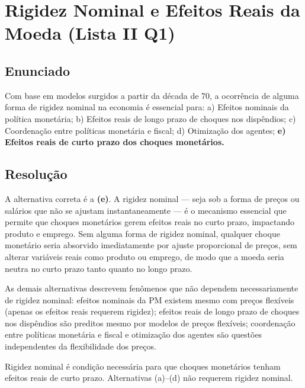 \documentclass[12pt, a4paper]{article}
\begin{document}
\section{Rigidez Nominal e Efeitos Reais da Moeda (Lista II Q1)}

\subsection*{Enunciado}
Com base em modelos surgidos a partir da década de 70, a ocorrência de alguma forma de rigidez nominal na economia é essencial para: a) Efeitos nominais da política monetária; b) Efeitos reais de longo prazo de choques nos dispêndios; c) Coordenação entre políticas monetária e fiscal; d) Otimização dos agentes; \textbf{e) Efeitos reais de curto prazo dos choques monetários.}

\subsection*{Resolução}

A alternativa correta é a \textbf{(e)}. A rigidez nominal --- seja sob a forma de preços ou salários que não se ajustam instantaneamente --- é o mecanismo essencial que permite que choques monetários gerem efeitos reais no curto prazo, impactando produto e emprego. Sem alguma forma de rigidez nominal, qualquer choque monetário seria absorvido imediatamente por ajuste proporcional de preços, sem alterar variáveis reais como produto ou emprego, de modo que a moeda seria neutra no curto prazo tanto quanto no longo prazo.

As demais alternativas descrevem fenômenos que não dependem necessariamente de rigidez nominal: efeitos nominais da PM existem mesmo com preços flexíveis (apenas os efeitos reais requerem rigidez); efeitos reais de longo prazo de choques nos dispêndios são preditos mesmo por modelos de preços flexíveis; coordenação entre políticas monetária e fiscal e otimização dos agentes são questões independentes da flexibilidade dos preços.

\begin{provabox}[title={Lista II Q1 --- Resposta: alternativa (e)}]
Rigidez nominal é condição necessária para que choques monetários tenham efeitos reais de curto prazo. Alternativas (a)--(d) não requerem rigidez nominal.
\end{provabox}

\end{document}
